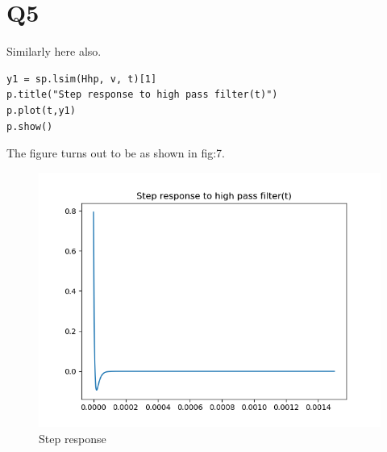\documentclass[12pt, a4paper]{report}
\begin{document}
\section*{Q5}
Similarly here also.

\begin{verbatim}
y1 = sp.lsim(Hhp, v, t)[1]   
p.title("Step response to high pass filter(t)") 
p.plot(t,y1)
p.show()
\end{verbatim}

The figure turns out to be as shown in fig:7.

 \begin{figure}
	\centering
	\includegraphics[scale=0.8]{figure_7..png}  %
	\caption{Step response}
	\label{fig:7}
\end{figure}
\end{document}
